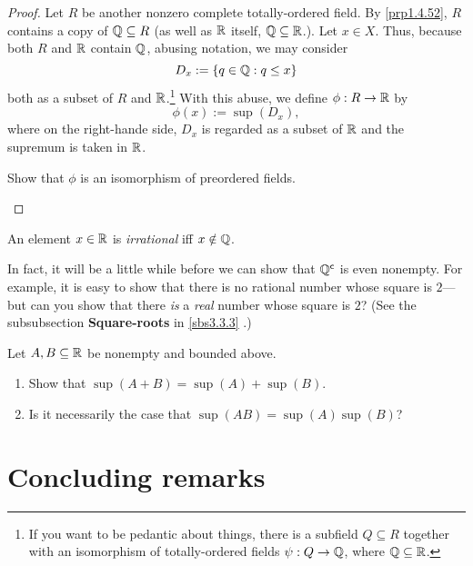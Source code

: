 \begin{thm}
\begin{proof}
Let $R$ be another nonzero complete totally-ordered field.  By \cref{prp1.4.52}, $R$ contains a copy of $\mathbb{Q} \subseteq R$ (as well as $\mathbb{R}$ itself, $\mathbb{Q} \subseteq \mathbb{R}$.).  Let $x\in X$.  Thus, because both $R$ and $\mathbb{R}$ contain $\mathbb{Q}$, abusing notation, we may consider
\begin{equation}
D_x:=\left\{ q\in \mathbb{Q} :q\leq x\right\}
\end{equation}
both as a subset of $R$ and $\mathbb{R}$.\footnote{If you want to be pedantic about things, there is a subfield $Q\subseteq R$ together with an isomorphism of totally-ordered fields $\psi :Q\rightarrow \mathbb{Q}$, where $\mathbb{Q} \subseteq \mathbb{R}$.}  With this abuse, we define $\phi :R\rightarrow \mathbb{R}$ by
\begin{equation}
\phi (x):=\sup (D_x),
\end{equation}
where on the right-hande side, $D_x$ is regarded as a subset of $\mathbb{R}$ and the supremum is taken in $\mathbb{R}$.
\begin{exr}
Show that $\phi$ is an isomorphism of preordered fields.
\end{exr}
\end{proof}
\end{thm}
\begin{dfn}
An element $x\in \mathbb{R}$ is \emph{irrational} iff $x\notin \mathbb{Q}$.
\begin{rmk}
In fact, it will be a little while before we can show that $\mathbb{Q} ^{\mathsf{c}}$ is even nonempty.  For example, it is easy to show that there is no rational number whose square is $2$---but can you show that there \emph{is} a \emph{real} number whose square is $2$?  (See the subsubsection \textbf{Square-roots} in \cref{sbs3.3.3} .)
\end{rmk}
\end{dfn}

\begin{exr}
Let $A,B\subseteq \mathbb{R}$ be nonempty and bounded above.
\begin{enumerate}
\item Show that $\sup (A+B)=\sup (A)+\sup (B)$.
\item Is it necessarily the case that $\sup (AB)=\sup (A)\sup (B)$?
\end{enumerate}
\end{exr}

\section{Concluding remarks}

